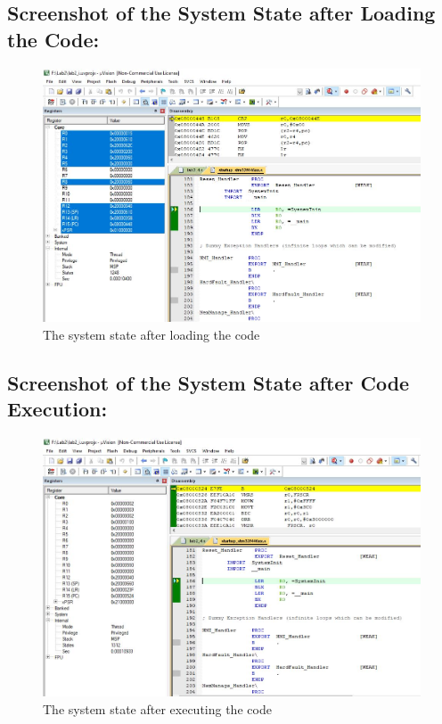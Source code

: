 \documentclass[12pt]{article}
\begin{document}
\subsection{Screenshot of the System State after Loading the Code:}
\begin{figure}[ht]
    \centering
    \includegraphics[scale=.7]{images/lab2_ss7.jpg}
    \caption{The system state after loading the code}
    \label{fig:before_task_four}
\end{figure}

\pagebreak

\subsection{Screenshot of the System State after Code Execution:}
\begin{figure}[ht]
    \centering
    \includegraphics[scale=.7]{images/lab2_ss8.jpg}
    \caption{The system state after executing the code}
    \label{fig:after_task_four}
\end{figure}

\pagebreak
\end{document}
